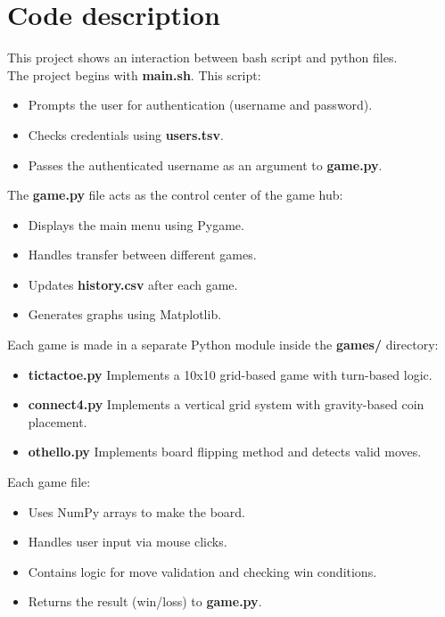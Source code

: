 \documentclass{article}
\begin{document}
\section{Code description}
This project shows an interaction between bash script and python files.\\
The project begins with \textbf{main.sh}. This script:
\begin{itemize}
    \item Prompts the user for authentication (username and password).
    \item Checks credentials using \textbf{users.tsv}.
    \item Passes the authenticated username as an argument to \textbf{game.py}.
\end{itemize}

The \textbf{game.py} file acts as the control center of the game hub:
\begin{itemize}
    \item Displays the main menu using Pygame.
    \item Handles transfer between different games.
    \item Updates \textbf{history.csv} after each game.
    \item Generates graphs using Matplotlib.
\end{itemize}

Each game is made in a separate Python module inside the \textbf{games/} directory:
\begin{itemize}
    \item \textbf{tictactoe.py} Implements a 10x10 grid-based game with turn-based logic.
    \item \textbf{connect4.py} Implements a vertical grid system with gravity-based coin placement.
    \item \textbf{othello.py} Implements board flipping method and detects valid moves.
\end{itemize}

Each game file:
\begin{itemize}
    \item Uses NumPy arrays to make the board.
    \item Handles user input via mouse clicks.
    \item Contains logic for move validation and checking win conditions.
    \item Returns the result (win/loss) to \textbf{game.py}.
\end{itemize}
\end{document}
